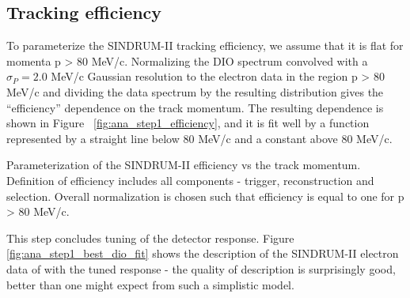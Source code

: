\subsection{Tracking efficiency}

To parameterize the SINDRUM-II tracking efficiency, we assume that it is flat
for momenta p > 80 MeV/c.
Normalizing the DIO spectrum convolved with a $\sigma_P = 2.0$ MeV/c Gaussian resolution
to the electron data in the region p > 80 MeV/c and dividing the data spectrum
by the resulting distribution gives the ``efficiency'' dependence on the track
momentum. The resulting dependence is shown in Figure ~\ref{fig:ana_step1_efficiency}, 
and it is fit well by a function represented by a straight line below 80 MeV/c
and a constant above 80 MeV/c.

%
 {
  \label{fig:ana_step1_efficiency}
  Parameterization of the SINDRUM-II efficiency vs the track momentum.
  Definition of efficiency includes all components - trigger, reconstruction and selection.
  Overall normalization is chosen such that efficiency is equal to one for p > 80 MeV/c.
}
\vspace{0.2in}

This step concludes tuning of the detector response. Figure \ref{fig:ana_step1_best_dio_fit}
shows the description of the SINDRUM-II electron data of \cite{sindrum_ii:Bertl2006}
with the tuned response - the quality of description is surprisingly good,
better than one might expect from such a simplistic model.

